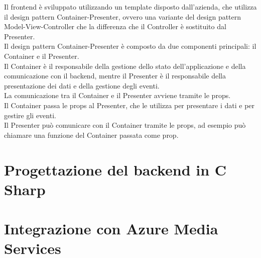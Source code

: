 Il frontend è sviluppato utilizzando un template disposto dall'azienda, che utilizza il design pattern Container-Presenter, ovvero una variante del design pattern Model-View-Controller che la differenza che il Controller è sostituito dal Presenter.\\
Il design pattern Container-Presenter è composto da due componenti principali: il Container e il Presenter.\\
Il Container è il responsabile della gestione dello stato dell'applicazione e della comunicazione con il backend, mentre il Presenter è il responsabile della presentazione dei dati e della gestione degli eventi.\\
La comunicazione tra il Container e il Presenter avviene tramite le props.\\
Il Container passa le props al Presenter, che le utilizza per presentare i dati e per gestire gli eventi.\\
Il Presenter può comunicare con il Container tramite le props, ad esempio può chiamare una funzione del Container passata come prop.\\





\section{Progettazione del backend in C Sharp}

\section{Integrazione con Azure Media Services}